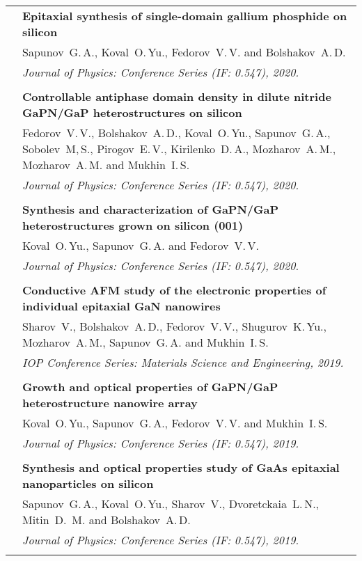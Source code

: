 \documentclass[letterpaper, 11pt]{article}
\begin{document}
\begin{longtable}{p{1.3in}p{4.8in}}
        & \textbf{Epitaxial synthesis of single-domain gallium phosphide on
        silicon} \\
        & Sapunov~G.\,A., Koval~O.\,Yu., Fedorov~V.\,V. and Bolshakov~A.\,D. \\
        & \textit{Journal of Physics: Conference Series (IF: 0.547), 2020.}\\
		& \\
		
        & \textbf{Controllable antiphase domain density in dilute nitride
        GaPN/GaP heterostructures on silicon} \\
        & Fedorov~V.\,V., Bolshakov~A.\,D., Koval~O.\,Yu., Sapunov~G.\,A.,
        Sobolev~M,\,S., Pirogov~E.\,V., Kirilenko~D.\,A., Mozharov~A.\,M.,
        Mozharov~A.\,M. and Mukhin~I.\,S. \\
        & \textit{Journal of Physics: Conference Series (IF: 0.547), 2020.}\\
		& \\
		
        & \textbf{Synthesis and characterization of GaPN/GaP heterostructures
        grown on silicon (001)} \\
        & Koval~O.\,Yu., Sapunov~G.\,A. and Fedorov~V.\,V. \\
        & \textit{Journal of Physics: Conference Series (IF: 0.547), 2020.}\\
		& \\
		
        & \textbf{Conductive AFM study of the electronic properties of
        individual epitaxial GaN nanowires} \\
        & Sharov~V., Bolshakov~A.\,D., Fedorov~V.\,V., Shugurov~K.\,Yu.,
        Mozharov~A.\,M., Sapunov~G.\,A. and Mukhin~I.\,S. \\
		& \textit{IOP Conference Series: Materials Science and Engineering, 2019.}\\
		& \\
		
        & \textbf{Growth and optical properties of GaPN/GaP heterostructure
        nanowire array} \\
        & Koval~O.\,Yu., Sapunov~G.\,A., Fedorov~V.\,V. and Mukhin~I.\,S. \\
		& \textit{Journal of Physics: Conference Series (IF: 0.547), 2019.}\\
		& \\
		
        & \textbf{Synthesis and optical properties study of GaAs epitaxial
        nanoparticles on silicon} \\
        & Sapunov~G.\,A., Koval~O.\,Yu., Sharov~V., Dvoretckaia~L.\,N.,
        Mitin~D.\, M. and Bolshakov~A.\,D. \\
		& \textit{Journal of Physics: Conference Series (IF: 0.547), 2019.}\\
		& \\
		

\end{longtable}
\end{document}
